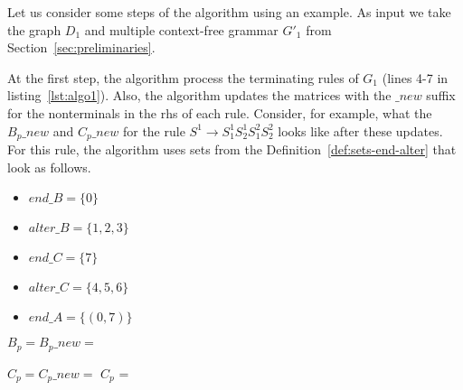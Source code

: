 Let us consider some steps of the algorithm using an example. As input we take the graph $D_1$ and multiple context-free grammar $G'_1$ from Section~\ref{sec:preliminaries}.

At the first step, the algorithm process the terminating rules of $G_1$ (lines 4-7 in listing~\ref{lst:algo1}). Also, the algorithm updates the matrices with the $\_new$ suffix for the nonterminals in the rhs of each rule. Consider, for example, what the $B_p\_new$ and $C_p\_new$ for the rule $S^1 \rightarrow S_1^1 S_2^1 S_1^2 S_2^2$ looks like after these updates. For this rule, the algorithm uses sets from the Definition~\ref{def:sets-end-alter} that look as follows.



\begin{center}
\begin{itemize}
    \item $end\_B = \{0\}$
    \item $alter\_B = \{1,2,3\}$
    \item $end\_C = \{7\}$
    \item $alter\_C = \{4,5,6\}$
    \item $end\_A = \{(0, 7)\}$
\end{itemize}
\end{center}

\begin{center}
$B_p = B_p\_new = $ {\footnotesize
{}
}
\end{center}






\begin{center}
$C_p = C_p\_new = $ $C_p$ = 
\end{center}




